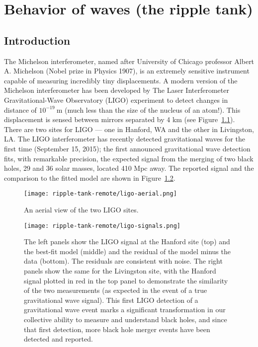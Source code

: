 \chapter{Behavior of waves (the ripple tank)}\label{cha:ripple-tank}


\section{Introduction}

The Michelson interferometer, named after University of Chicago professor Albert A. Michelson (Nobel prize in Physics 1907), is an extremely sensitive instrument capable of measuring incredibly tiny displacements.
A modern version of the Michelson interferometer has been developed by The Laser Interferometer Gravitational-Wave Observatory (LIGO) experiment to detect changes in distance of $10^{-19}\:$m (much less than the size of the nucleus of an atom!).
This displacement is sensed between mirrors separated by 4 km (see Figure~\ref{rt:fig:ligo-aerial}). There are two sites for LIGO --- one in Hanford, WA and the other in Livingston, LA.
The LIGO interferometer has recently detected gravitational waves for the first time (September 15, 2015); the first announced gravitational wave detection fits, with remarkable precision, the expected signal from the merging of two black holes, 29 and 36 solar masses, located 410 Mpc away.
The reported signal and the comparison to the fitted model are shown in Figure~\ref{rt:fig:ligo-signals}.

\begin{figure}
	\texttt{[image: ripple-tank-remote/ligo-aerial.png]}
	\caption{An aerial view of the two LIGO sites.}\label{rt:fig:ligo-aerial}
\end{figure}

\begin{figure}
	\centering
	\texttt{[image: ripple-tank-remote/ligo-signals.png]}
	\caption{The left panels show the LIGO signal at the Hanford site (top) and the best-fit model
		(middle) and the residual of the model minus the data (bottom). The residuals are consistent
		with noise. The right panels show the same for the Livingston site, with the Hanford signal
		plotted in red in the top panel to demonstrate the similarity of the two measurements (as
		expected in the event of a true gravitational wave signal). This first LIGO detection of a
		gravitational wave event marks a significant transformation in our collective ability to
		measure and understand black holes, and since that first detection, more black hole merger
		events have been detected and reported.}\label{rt:fig:ligo-signals}
\end{figure}

